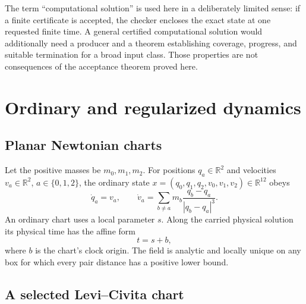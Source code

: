 \documentclass[11pt]{article}
\newcommand{\R}{\mathbb{R}}
\begin{document}
The term ``computational solution'' is used here in a deliberately limited
sense: if a finite certificate is accepted, the checker encloses the exact
state at one requested finite time.  A general certified computational
solution would additionally need a producer and a theorem establishing
coverage, progress, and suitable termination for a broad input class.  Those
properties are not consequences of the acceptance theorem proved here.

\section{Ordinary and regularized dynamics}
\label{sec:dynamics}

\subsection{Planar Newtonian charts}

Let the positive masses be $m_0,m_1,m_2$.  For positions
$q_a\in\R^2$ and velocities $v_a\in\R^2$, $a\in\{0,1,2\}$, the ordinary
state $x=(q_0,q_1,q_2,v_0,v_1,v_2)\in\R^{12}$ obeys
\begin{equation}
 \dot q_a=v_a,
 \qquad
 \dot v_a=\sum_{b\ne a}m_b
       \frac{q_b-q_a}{|q_b-q_a|^3}.
 \label{eq:newton}
\end{equation}
An ordinary chart uses a local parameter $s$.  Along the carried physical
solution its physical time has the affine form
\begin{equation}
 t=s+b,
 \label{eq:ordinary-clock}
\end{equation}
where $b$ is the chart's clock origin.  The field is analytic and locally
unique on any box for which every pair distance has a positive lower bound.

\subsection{A selected Levi--Civita chart}
\end{document}
